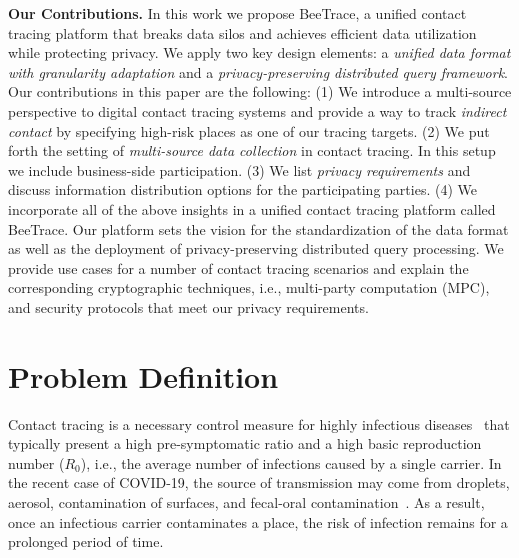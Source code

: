 \documentclass[11pt,dvipdfmx]{article}  %
\newcommand{\sysname}{\textsf{BeeTrace}\xspace}
\begin{document}
\textbf{Our Contributions.} In this work we propose \sysname, a unified contact tracing platform that breaks data silos and achieves efficient data utilization while protecting privacy. We apply two key design elements: a \emph{unified data format with granularity adaptation} and a \emph{privacy-preserving distributed query framework}. %
Our contributions in this paper are the following: (1) We introduce a multi-source perspective to digital contact tracing systems and provide a way to track \emph{indirect contact} by specifying high-risk places as one of our tracing targets. (2) We put forth the setting of \emph{multi-source data collection} in contact tracing. In this setup we include business-side participation. (3) We list \emph{privacy requirements} and discuss information distribution options for the participating parties. (4) We incorporate all of the above insights in a unified contact tracing platform called \sysname. Our platform sets the vision for the standardization of the data format as well as the deployment of privacy-preserving distributed query processing. We provide use cases for a number of contact tracing scenarios and explain the corresponding cryptographic techniques, i.e., multi-party computation (MPC), and security protocols that meet our privacy requirements. 


\section{Problem Definition}


    Contact tracing is a necessary control measure for highly infectious diseases~\cite{Fraser2004} that typically present a high pre-symptomatic ratio and a high basic reproduction number ($R_0$), i.e., the average number of infections caused by a single carrier. In the recent case of COVID-19, the source of transmission may come from droplets, aerosol, contamination of surfaces, and fecal-oral contamination~\cite{Ferretti2020}. As a result, once an infectious carrier contaminates a place, the risk of infection remains for a prolonged period of time.  
\end{document}
